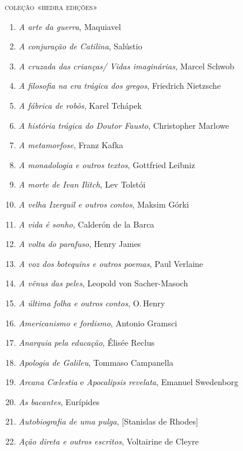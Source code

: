 \pagebreak
\blankpage
\pagestyle{empty}
\begingroup
\fontsize{7}{8}\selectfont

{\large\textsc{coleção «hedra edições»}}

\begin{enumerate}
\setlength\parskip{4.2pt}
\setlength\itemsep{-1.4mm}
\item \textit{A arte da guerra}, Maquiavel
\item \textit{A conjuração de Catilina}, Salústio
\item \textit{A cruzada das crianças/ Vidas imaginárias}, Marcel Schwob
\item \textit{A filosofia na era trágica dos gregos}, Friedrich Nietzsche
\item \textit{A fábrica de robôs}, Karel Tchápek 
\item \textit{A história trágica do Doutor Fausto}, Christopher Marlowe
\item \textit{A metamorfose}, Franz Kafka
\item \textit{A monadologia e outros textos}, Gottfried Leibniz
\item \textit{A morte de Ivan Ilitch}, Lev Tolstói 
\item \textit{A velha Izerguil e outros contos}, Maksim Górki
\item \textit{A vida é sonho}, Calderón de la Barca
\item \textit{A volta do parafuso}, Henry James
\item \textit{A voz dos botequins e outros poemas}, Paul Verlaine 
\item \textit{A vênus das peles}, Leopold von Sacher{}-Masoch
\item \textit{A última folha e outros contos}, O.\,Henry
\item \textit{Americanismo e fordismo}, Antonio Gramsci
\item \textit{Anarquia pela educação}, Élisée Reclus 
\item \textit{Apologia de Galileu}, Tommaso Campanella 
\item \textit{Arcana C\oe lestia} e \textit{Apocalipsis revelata}, Emanuel Swedenborg
\item \textit{As bacantes}, Eurípides
\item \textit{Autobiografia de uma pulga}, [Stanislas de Rhodes]
\item \textit{Ação direta e outros escritos}, Voltairine de Cleyre

\end{enumerate}
